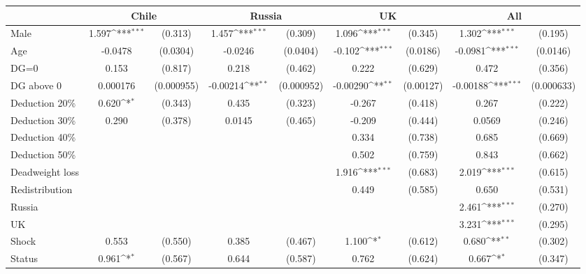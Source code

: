 {
\def\sym#1{\ifmmode^{#1}\else\(^{#1}\)\fi}
\begin{tabular}{l*{4}{cc}}
\hline\hline
                &\multicolumn{2}{c}{Chile}   &\multicolumn{2}{c}{Russia}  &\multicolumn{2}{c}{UK}      &\multicolumn{2}{c}{All}     \\
\hline
Male            &    1.597\sym{***}&  (0.313)&    1.457\sym{***}&  (0.309)&    1.096\sym{***}&  (0.345)&    1.302\sym{***}&  (0.195)\\
Age             &  -0.0478         & (0.0304)&  -0.0246         & (0.0404)&   -0.102\sym{***}& (0.0186)&  -0.0981\sym{***}& (0.0146)\\
DG=0            &    0.153         &  (0.817)&    0.218         &  (0.462)&    0.222         &  (0.629)&    0.472         &  (0.356)\\
DG above 0      & 0.000176         &(0.000955)& -0.00214\sym{**} &(0.000952)& -0.00290\sym{**} &(0.00127)& -0.00188\sym{***}&(0.000633)\\
Deduction 20\%  &    0.620\sym{*}  &  (0.343)&    0.435         &  (0.323)&   -0.267         &  (0.418)&    0.267         &  (0.222)\\
Deduction 30\%  &    0.290         &  (0.378)&   0.0145         &  (0.465)&   -0.209         &  (0.444)&   0.0569         &  (0.246)\\
Deduction 40\%  &                  &         &                  &         &    0.334         &  (0.738)&    0.685         &  (0.669)\\
Deduction 50\%  &                  &         &                  &         &    0.502         &  (0.759)&    0.843         &  (0.662)\\
Deadweight loss &                  &         &                  &         &    1.916\sym{***}&  (0.683)&    2.019\sym{***}&  (0.615)\\
Redistribution  &                  &         &                  &         &    0.449         &  (0.585)&    0.650         &  (0.531)\\
Russia          &                  &         &                  &         &                  &         &    2.461\sym{***}&  (0.270)\\
UK              &                  &         &                  &         &                  &         &    3.231\sym{***}&  (0.295)\\
Shock           &    0.553         &  (0.550)&    0.385         &  (0.467)&    1.100\sym{*}  &  (0.612)&    0.680\sym{**} &  (0.302)\\
Status          &    0.961\sym{*}  &  (0.567)&    0.644         &  (0.587)&    0.762         &  (0.624)&    0.667\sym{*}  &  (0.347)\\

\end{tabular}}

